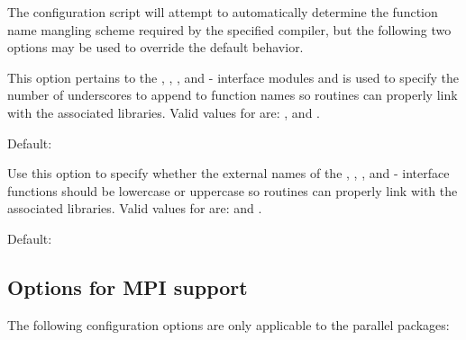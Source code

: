 \noindent The configuration script will attempt to automatically determine the
function name mangling scheme required by the specified {\F} compiler, but the
following two options may be used to override the default behavior.

\begin{config}

\item {}

  This option pertains to the {\fcvode}, {\fkinsol}, {\fida}, and {\fnvector}
  {\F}-{\C} interface modules and is used to specify the number of underscores to
  append to function names so {\F} routines can properly link with the associated
  {\sundials} libraries. Valid values for  are: , 
  and .

  Default: 

\item {}

  Use this option to specify whether the external names of the {\fcvode},
  {\fkinsol}, {\fida}, and {\fnvector} {\F}-{\C} interface functions should be
  lowercase or uppercase so {\F} routines can properly link with the associated
  {\sundials} libraries. Valid values for  are:  and .

  Default: 

\end{config}



\subsection*{Options for MPI support}

\noindent The following configuration options are only applicable to the parallel {\sundials} packages:

